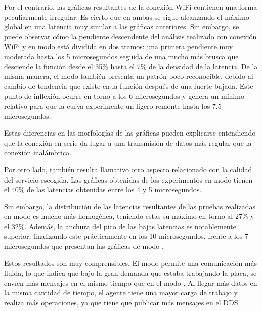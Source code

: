 \documentclass[a4paper,11pt,spanish]{sphinxmanual}
\begin{document}
\sphinxAtStartPar
Por el contrario, las gráficas resultantes de la conexión Wi\sphinxhyphen{}Fi contienen
una forma peculiarmente irregular. Es cierto que en ambas se sigue alcanzando
el máximo global en una latencia muy similar a las gráficas anteriores. Sin embargo,
se puede observar cómo la pendiente descendente del análisis realizado con conexión
Wi\sphinxhyphen{}Fi y en modo  está dividida en dos tramos: una primera pendiente muy moderada
hasta los 5 microsegundos seguida de una mucho más brusca que desciende la función desde el
35\% hasta el 7\% de la densidad de la latencia. De la misma manera, el modo  también
presenta un patrón poco reconocible, debido al cambio de tendencia que existe en la función
después de una fuerte bajada. Este punto de inflexión ocurre en torno a los 6 microsegundos y
genera un mínimo relativo para que la curva experimente un ligero remonte hasta los
7.5 microsegundos.

\sphinxAtStartPar
Estas diferencias en las morfologías de las gráficas pueden explicarse entendiendo
que la conexión en serie da lugar a una transmisión de datos más regular que
la conexión inalámbrica.

\sphinxAtStartPar
Por otro lado, también resulta llamativo otro aspecto relacionado con la calidad
del servicio escogida. Las gráficas obtenidas de los experimentos en modo
 tienen el 40\% de las latencias obtenidas entre los 4 y 5 microsegundos.

\sphinxAtStartPar
Sin embargo, la distribución de las latencias resultantes de las pruebas realizadas
en modo  es mucho más homogénea, teniendo estas su máximo en torno al
27\% y el 32\%. Además, la anchura del pico de las bajas latencias es notablemente
superior, finalizando este prácticamente en los 10 microsegundos, frente a los
7 microsegundos que presentan las gráficas de modo .

\sphinxAtStartPar
Estos resultados son muy comprensibles. El modo  permite una comunicación
más fluida, lo que indica que bajo la gran demanda que estaba trabajando la placa,
se envíen más mensajes en el mismo tiempo que en el modo . Al llegar más datos
en la misma cantidad de tiempo, el agente tiene una mayor carga de trabajo y realiza
más operaciones, ya que tiene que publicar más mensajes en el DDS.
\end{document}
